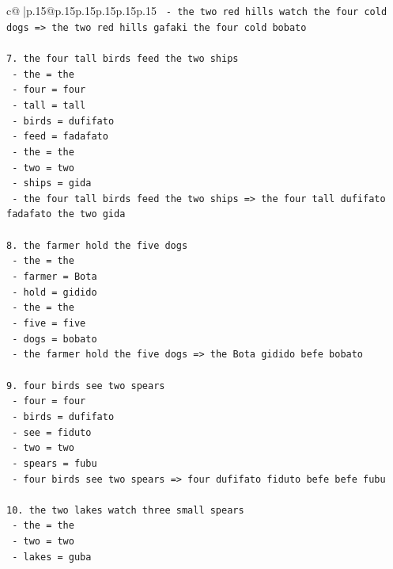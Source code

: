 \documentclass{article}
\begin{document}
{\begin{supertabular}{c@{$\;$}|p{.15\linewidth}@{}p{.15\linewidth}p{.15\linewidth}p{.15\linewidth}p{.15\linewidth}p{.15\linewidth}}
{{{\texttt{   {-} the two red hills watch the four cold dogs => the two red hills gafaki the four cold bobato} \\
\\ 
\texttt{7. the four tall birds feed the two ships} \\
\texttt{   {-} the = the} \\
\texttt{   {-} four = four} \\
\texttt{   {-} tall = tall} \\
\texttt{   {-} birds = dufifato} \\
\texttt{   {-} feed = fadafato} \\
\texttt{   {-} the = the} \\
\texttt{   {-} two = two} \\
\texttt{   {-} ships = gida} \\
\texttt{   {-} the four tall birds feed the two ships => the four tall dufifato fadafato the two gida} \\
\\ 
\texttt{8. the farmer hold the five dogs} \\
\texttt{   {-} the = the} \\
\texttt{   {-} farmer = Bota} \\
\texttt{   {-} hold = gidido} \\
\texttt{   {-} the = the} \\
\texttt{   {-} five = five} \\
\texttt{   {-} dogs = bobato} \\
\texttt{   {-} the farmer hold the five dogs => the Bota gidido befe bobato} \\
\\ 
\texttt{9. four birds see two spears} \\
\texttt{   {-} four = four} \\
\texttt{   {-} birds = dufifato} \\
\texttt{   {-} see = fiduto} \\
\texttt{   {-} two = two} \\
\texttt{   {-} spears = fubu} \\
\texttt{   {-} four birds see two spears => four dufifato fiduto befe befe fubu} \\
\\ 
\texttt{10. the two lakes watch three small spears} \\
\texttt{    {-} the = the} \\
\texttt{    {-} two = two} \\
\texttt{    {-} lakes = guba} \\
}}}
\end{supertabular}}
\end{document}
